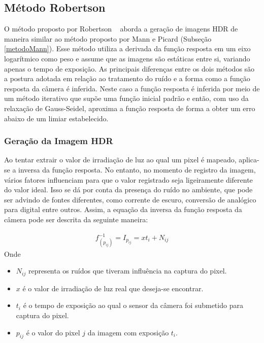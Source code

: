 \subsection{Método Robertson} \label{metodoRobertson}

O método proposto por Robertson \etal~\cite{robertson} aborda a geração de imagens HDR de maneira similar ao método proposto por Mann e Picard (Subseção \ref{metodoMann}). Esse método utiliza a derivada da função resposta em um eixo logarítmico como peso e assume que as imagens são estáticas entre si, variando apenas o tempo de exposição. As principais diferenças entre os dois métodos são a postura adotada em relação ao tratamento do ruído e a forma como a função resposta da câmera é inferida. Neste caso a função resposta é inferida por meio de um método iterativo que supõe uma função inicial padrão e então, com uso da relaxação de Gauss-Seidel, aproxima a função resposta de forma a obter um erro abaixo de um limiar estabelecido.

\subsubsection{Geração da Imagem HDR} \label{metodoRobertsonGeracao}

Ao tentar extrair o valor de irradiação de luz ao qual um pixel é mapeado, aplica-se a inversa da função resposta. No entanto, no momento de registro da imagem, vários fatores influenciam para que o valor registrado seja ligeiramente diferente do valor ideal. Isso se dá por conta da presença do ruído no ambiente, que pode ser advindo de fontes diferentes, como corrente de escuro, conversão de analógico para digital entre outros. Assim, a equação da inversa da função resposta da câmera pode ser descrita da seguinte maneira:

\begin{align} \label{eqRobertsonIFR}
	f_{(p_{ij})}^{-1} = I_{p_{ij}} = xt_{i} + N_{ij}
\end{align}
Onde
\begin{itemize}
\item $N_{ij}$ representa os ruídos que tiveram influência na captura do pixel.
\item $x$ é o valor de irradiação de luz real que deseja-se encontrar.
\item $t_{i}$ é o tempo de exposição ao qual o sensor da câmera foi submetido para captura do pixel.
\item $p_{ij}$ é o valor do pixel $j$ da imagem com exposição $t_{i}$.
\end{itemize}

